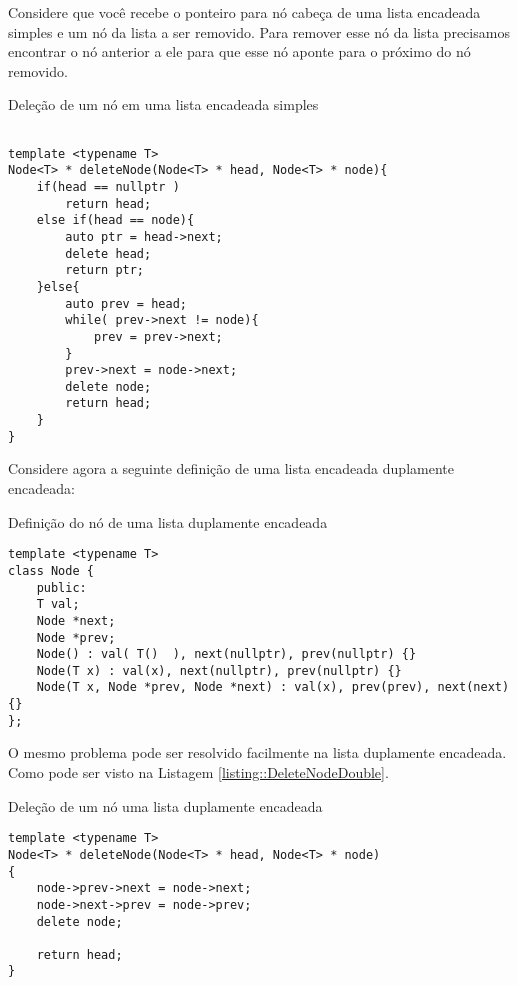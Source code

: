 Considere que você recebe o ponteiro para nó cabeça de uma lista encadeada simples e um nó da lista a ser removido. Para remover esse nó da lista precisamos encontrar o nó anterior a ele para que esse nó aponte para o próximo do nó removido.

\newpage 
\begin{listing}[!ht]
\caption{Deleção de um nó em uma lista encadeada simples}

\begin{verbatim}

template <typename T>
Node<T> * deleteNode(Node<T> * head, Node<T> * node){
    if(head == nullptr )
        return head;
    else if(head == node){
        auto ptr = head->next;
        delete head;
        return ptr;
    }else{
        auto prev = head;
        while( prev->next != node){
            prev = prev->next;
        }
        prev->next = node->next;
        delete node;
        return head;
    }
}
\end{verbatim}
\end{listing}

Considere agora a  seguinte definição de uma lista encadeada duplamente encadeada:


\begin{listing}[!ht]
\caption{Definição do nó de uma lista duplamente encadeada}
\begin{verbatim}
template <typename T>
class Node {
    public:
    T val;
    Node *next;
    Node *prev;
    Node() : val( T()  ), next(nullptr), prev(nullptr) {}
    Node(T x) : val(x), next(nullptr), prev(nullptr) {}
    Node(T x, Node *prev, Node *next) : val(x), prev(prev), next(next) {} 
};

\end{verbatim}
\end{listing}

O mesmo problema pode ser resolvido facilmente na lista duplamente encadeada. Como pode ser visto na Listagem \ref{listing::DeleteNodeDouble}.

\begin{listing}[!ht]
\caption{Deleção de um nó uma lista duplamente encadeada}
\label{listing::DeleteNodeDouble}
\begin{verbatim}
template <typename T>
Node<T> * deleteNode(Node<T> * head, Node<T> * node)
{
    node->prev->next = node->next;
    node->next->prev = node->prev;
    delete node;

    return head;
}
\end{verbatim}
\end{listing}



